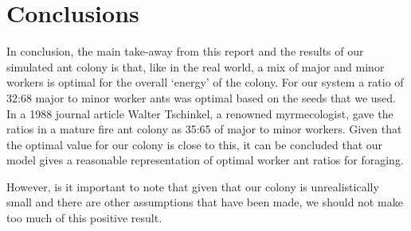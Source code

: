  \section{Conclusions}
In conclusion, the main take-away from this report and the results of our simulated ant colony is that, like in the real world, a mix of major and minor workers is optimal for the overall `energy' of the colony. For our system a ratio of 32:68 major to minor worker ants was optimal based on the seeds that we used. In a 1988 journal article \cite{Tschinkel1988} Walter Tschinkel, a renowned myrmecologist, gave the ratios in a mature fire ant colony as 35:65 of major to minor workers. Given that the optimal value for our colony is close to this, it can be concluded that our model gives a reasonable representation of optimal worker ant ratios for foraging.\par
However, is it important to note that given that our colony is unrealistically small and there are other assumptions that have been made, we should not make too much of this positive result. 